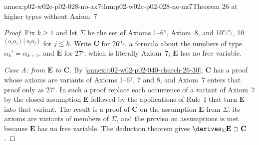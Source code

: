\begin{annexitem}{annex:p02-w02c-p02-028-no-ax7}{thm:p02-w02c-p02-028-no-ax7}{Theorem 26 at higher types without Axiom~7}
\begin{proof}
Fix \(k\ge1\) and let \(\Sigma\) be the set of Axioms 1--6\(^\gamma\),
Axiom~8, and 10\(^{\alpha_j\alpha_j}\), 10\(^{(\alpha_j\alpha_j)(\alpha_j\alpha_j)}\)
for \(j\le k\).  Write \(\mathbf C\) for 26\(^{\alpha_k}\), a formula about
the numbers of type \(\alpha_k'=\alpha_{k+1}\), and \(\mathbf E\) for
27\(^\iota\), which is literally Axiom~7; \(\mathbf E\) has no free
variable.

\emph{Case A: from \(\mathbf E\) to \(\mathbf C\).}  By
\cref{annex:p02-w02-p02-040-church-26-30}, \(\mathbf C\) has a proof whose
axioms are variants of Axioms 1--6\(^\gamma\), 7 and 8, and Axiom~7 enters
that proof only as 27\(^\iota\).  In such a proof replace each occurrence of
a variant of Axiom~7 by the closed assumption \(\mathbf E\) followed by the
applications of Rule~I that turn \(\mathbf E\) into that variant.  The
result is a proof of \(\mathbf C\) on the assumption \(\mathbf E\) from
\(\Sigma\): its axioms are variants of members of \(\Sigma\), and the
proviso on assumptions is met because \(\mathbf E\) has no free variable.
The deduction theorem gives \(\derives_\Sigma\mathbf E\supset\mathbf C\).


\end{proof}
\end{annexitem}
